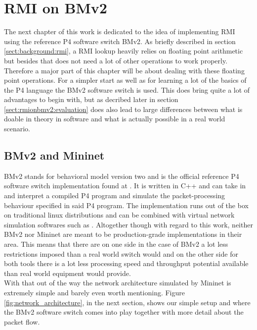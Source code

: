 
\chapter{RMI on BMv2}
\label{ch:rmionbmv2}

The next chapter of this work is dedicated to the idea of implementing RMI using the reference P4 software switch BMv2. As briefly described in section \ref{sect:background:rmi}, a RMI lookup heavily relies on floating point arithmetic but besides that does not need a lot of other operations to work properly. Therefore a major part of this chapter will be about dealing with these floating point operations. For a simpler start as well as for learning a lot of the basics of the P4 language the BMv2 software switch is used. This does bring quite a lot of advantages to begin with, but as decribed later in section \ref{sect:rmionbmv2:evaluation} does also lead to large differences between what is doable in theory in software and what is actually possible in a real world scenario.

\section{BMv2 and Mininet}
BMv2 stands for behavioral model version two and is the official reference P4 software switch implementation found at \cite{bmv2}. It is written in C++ and can take in and interpret a compiled P4 program and simulate the packet-processing behaviour specified in said P4 program. The implementation runs out of the box on traditional linux distributions and can be combined with virtual network simulation softwares such as \cite{mininet}. Altogether though with regard to this work, neither BMv2 nor Mininet are meant to be production-grade implementations in their area. This means that there are on one side in the case of BMv2 a lot less restrictions imposed than a real world switch would and on the other side for both tools there is a lot less processing speed and throughput potential available than real world equipment would provide.\\

With that out of the way the network architecture simulated by Mininet is extremely simple and barely even worth mentioning. Figure \ref{fig:network_architecture}, in the next section, shows our simple setup and where the BMv2 software switch comes into play together with more detail about the packet flow.

